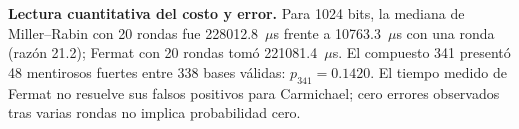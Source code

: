 \noindent\textbf{Lectura cuantitativa del costo y error.} Para 1024 bits, la mediana de Miller--Rabin con 20 rondas fue 228012.8~$\mu$s frente a 10763.3~$\mu$s con una ronda (razón 21.2); Fermat con 20 rondas tomó 221081.4~$\mu$s. El compuesto 341 presentó 48 mentirosos fuertes entre 338 bases válidas: $p_{341}=0.1420$. El tiempo medido de Fermat no resuelve sus falsos positivos para Carmichael; cero errores observados tras varias rondas no implica probabilidad cero.\par
